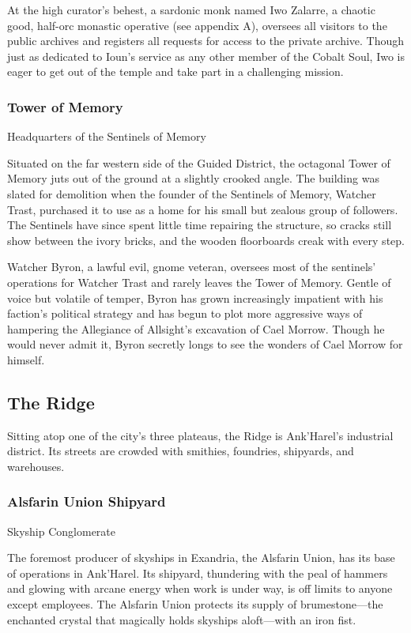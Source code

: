 \documentclass[10pt,a4paper,twoside,twocolumn,openany,nodeprecatedcode]{dndbook}
\begin{document}
At the high curator's behest, a sardonic monk named Iwo Zalarre, a chaotic good, half-orc monastic operative (see appendix A), oversees all visitors to the public archives and registers all requests for access to the private archive. Though just as dedicated to Ioun's service as any other member of the Cobalt Soul, Iwo is eager to get out of the temple and take part in a challenging mission.

\subsubsection{Tower of Memory}
Headquarters of the Sentinels of Memory

Situated on the far western side of the Guided District, the octagonal Tower of Memory juts out of the ground at a slightly crooked angle. The building was slated for demolition when the founder of the Sentinels of Memory, Watcher Trast, purchased it to use as a home for his small but zealous group of followers. The Sentinels have since spent little time repairing the structure, so cracks still show between the ivory bricks, and the wooden floorboards creak with every step.

Watcher Byron, a lawful evil, gnome veteran, oversees most of the sentinels' operations for Watcher Trast and rarely leaves the Tower of Memory. Gentle of voice but volatile of temper, Byron has grown increasingly impatient with his faction's political strategy and has begun to plot more aggressive ways of hampering the Allegiance of Allsight's excavation of Cael Morrow. Though he would never admit it, Byron secretly longs to see the wonders of Cael Morrow for himself.

\subsection{The Ridge}
Sitting atop one of the city's three plateaus, the Ridge is Ank'Harel's industrial district. Its streets are crowded with smithies, foundries, shipyards, and warehouses.

\subsubsection{Alsfarin Union Shipyard}
Skyship Conglomerate

The foremost producer of skyships in Exandria, the Alsfarin Union, has its base of operations in Ank'Harel. Its shipyard, thundering with the peal of hammers and glowing with arcane energy when work is under way, is off limits to anyone except employees. The Alsfarin Union protects its supply of brumestone—the enchanted crystal that magically holds skyships aloft—with an iron fist.
\end{document}
